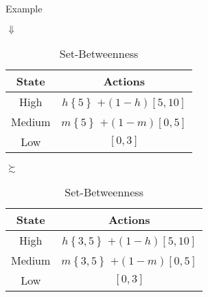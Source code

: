 \documentclass[usenames,dvipsnames,aspectratio=169,11pt, envcountsect]{beamer}
\begin{document}
\begin{frame}{Example}
	\begin{center}
		\( \Downarrow \)
	\end{center}

	\begin{table}[H]
		\centering
		\begin{minipage}{0.45\textwidth}
			\centering
			\begin{tabular}{c | c}
				State                          & Actions                                                                                       \\
				\hline
				{\color{bleudefrance} High}    & {\color{bleudefrance}\( h \left\{ 5 \right\} \) } \(+ \left(1-h \right) \left[5,10 \right] \) \\
				{\color{bleudefrance} Medium } & {\color{bleudefrance}\( m \left\{ 5 \right\} \) } \(+ \left(1-m \right) \left[0,5 \right] \)  \\
				Low                            & \( \left[0,3 \right] \)                                                                       \\
			\end{tabular}
			\vspace{0.5cm} %
		\end{minipage}\hspace{0.25cm} %
		\( \succsim \) %
		\hspace{0.25cm}
		\begin{minipage}{0.45\textwidth}
			\centering
			\begin{tabular}{c | c}
				State                          & Actions                                                                                         \\
				\hline
				{\color{bleudefrance} High}    & {\color{bleudefrance}\( h \left\{ 3,5 \right\} \) } \(+ \left(1-h \right) \left[5,10 \right] \) \\
				{\color{bleudefrance} Medium } & {\color{bleudefrance}\( m \left\{ 3,5 \right\} \) } \(+ \left(1-m \right) \left[0,5 \right] \)  \\
				Low                            & \( \left[0,3 \right] \)                                                                         \\
			\end{tabular}
			\vspace{0.5cm} %
		\end{minipage}
		\caption{Set-Betweenness} %
		\label{tab:sbetweenness}
	\end{table}
\end{frame}
\end{document}
